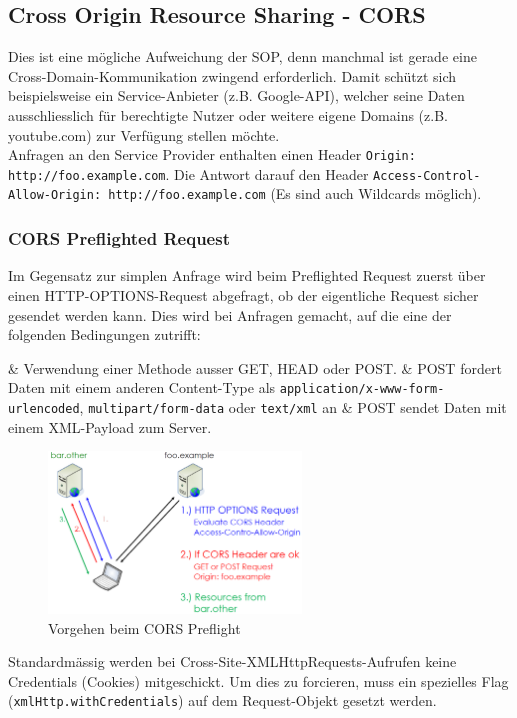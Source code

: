 \subsection{Cross Origin Resource Sharing - CORS}
Dies ist eine mögliche Aufweichung der SOP, denn manchmal ist gerade eine Cross-Domain-Kommunikation zwingend erforderlich.
Damit schützt sich beispielsweise ein Service-Anbieter (z.B. Google-API), welcher seine Daten ausschliesslich für berechtigte Nutzer oder weitere eigene Domains (z.B. youtube.com) zur Verfügung stellen möchte.\\
Anfragen an den Service Provider enthalten einen Header \lstinline|Origin: http://foo.example.com|. Die Antwort darauf den Header \lstinline|Access-Control-Allow-Origin: http://foo.example.com| (Es sind auch Wildcards möglich).

\subsubsection{CORS Preflighted Request}

Im Gegensatz zur simplen Anfrage wird beim Preflighted Request zuerst über einen HTTP-OPTIONS-Request abgefragt, ob der eigentliche Request sicher gesendet werden kann. Dies wird bei Anfragen gemacht, auf die eine der folgenden Bedingungen zutrifft:
\begin{easylist}[itemize]
	& Verwendung einer Methode ausser GET, HEAD oder POST.
	& POST fordert Daten mit einem anderen Content-Type als \lstinline|application/x-www-form-urlencoded|, \lstinline|multipart/form-data| oder \lstinline|text/xml| an
	& POST sendet Daten mit einem XML-Payload zum Server.
\end{easylist}

\begin{figure}[H]
	\centering
	\includegraphics[width=0.6\textwidth]{./img/cors-preflight}
	\caption{Vorgehen beim CORS Preflight}
\end{figure}

Standardmässig werden bei Cross-Site-XMLHttpRequests-Aufrufen keine Credentials (Cookies) mitgeschickt. Um dies zu forcieren, muss ein spezielles Flag (\lstinline|xmlHttp.withCredentials|) auf dem Request-Objekt gesetzt werden.

